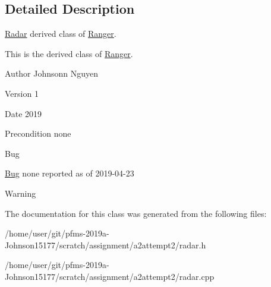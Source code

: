 \subsection{Detailed Description}
\hyperlink{classRadar}{Radar} derived class of \hyperlink{classRanger}{Ranger}. 

This is the derived class of \hyperlink{classRanger}{Ranger}.~\newline
\begin{DoxyAuthor}{Author}
Johnsonn Nguyen 
\end{DoxyAuthor}
\begin{DoxyVersion}{Version}
1 
\end{DoxyVersion}
\begin{DoxyDate}{Date}
2019 
\end{DoxyDate}
\begin{DoxyPrecond}{Precondition}
none 
\end{DoxyPrecond}
\begin{DoxyRefDesc}{Bug}
\item[\hyperlink{bug__bug000003}{Bug}]none reported as of 2019-\/04-\/23 \end{DoxyRefDesc}
\begin{DoxyWarning}{Warning}

\end{DoxyWarning}


The documentation for this class was generated from the following files\+:\begin{DoxyCompactItemize}
\item 
/home/user/git/pfms-\/2019a-\/\+Johnson15177/scratch/assignment/a2attempt2/radar.\+h\item 
/home/user/git/pfms-\/2019a-\/\+Johnson15177/scratch/assignment/a2attempt2/radar.\+cpp\end{DoxyCompactItemize}
